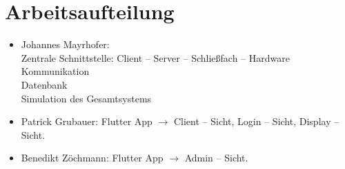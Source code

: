 \section{Arbeitsaufteilung}
\begin{itemize}
    \item Johannes Mayrhofer: \\ Zentrale Schnittstelle: Client -- Server -- Schließfach -- Hardware Kommunikation\\ Datenbank \\ Simulation des Gesamtsystems
    \item Patrick Grubauer: Flutter App $\rightarrow$ Client – Sicht, Login – Sicht, Display – Sicht.
    \item Benedikt Zöchmann: Flutter App $\rightarrow$ Admin – Sicht.
\end{itemize}


